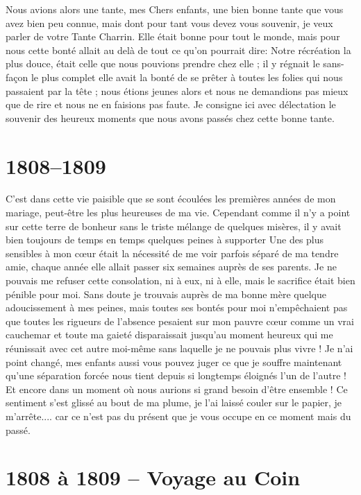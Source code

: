 \documentclass[11pt,a4paper]{report}
\begin{document}
Nous avions alors une tante, mes Chers enfants, une bien bonne tante que vous avez bien peu connue, mais dont pour tant vous devez vous souvenir, je veux parler de votre Tante Charrin. Elle était bonne pour tout le monde, mais pour nous cette bonté allait au delà de tout ce qu'on pourrait dire: Notre récréation la plus douce, était celle que nous pouvions prendre chez elle ; il y régnait le sans-façon le plus complet elle avait la bonté de se prêter à toutes les folies qui nous passaient par la tête ; nous étions jeunes alors et nous ne demandions pas mieux que de rire et nous ne en faisions pas faute. Je consigne ici avec délectation le souvenir des heureux moments que nous avons passés chez cette bonne tante.

\section*{1808--1809}

C'est dans cette vie paisible que se sont écoulées les premières années de mon mariage, peut-être les plus heureuses de ma vie. Cependant comme il n'y a point sur cette terre de bonheur sans le triste mélange de quelques misères, il y avait bien toujours de temps en temps quelques peines à supporter Une des plus sensibles à mon cœur était la nécessité de me voir parfois séparé de ma tendre amie, chaque année elle allait passer six semaines auprès de ses parents. Je ne pouvais me refuser cette consolation, ni à eux, ni à elle, mais le sacrifice était bien pénible pour moi. Sans doute je trouvais auprès de ma bonne mère quelque adoucissement à mes peines, mais toutes ses bontés pour moi n'empêchaient pas que toutes les rigueurs de l'absence pesaient sur mon pauvre cœur comme un vrai cauchemar et toute ma gaieté disparaissait jusqu'au moment heureux qui me réunissait avec cet autre moi-même sans laquelle je ne pouvais plus vivre ! Je n'ai point changé, mes enfants aussi vous pouvez juger ce que je souffre maintenant qu'une séparation forcée nous tient depuis si longtemps éloignés l'un de l'autre ! Et encore dans un moment où nous aurions si grand besoin d'être ensemble ! Ce sentiment s'est glissé au bout de ma plume, je l'ai laissé couler sur le papier, je m'arrête.... car ce n'est pas du présent que je vous occupe en ce moment mais du passé.

\section*{1808 à 1809 -- Voyage au Coin}
\end{document}
